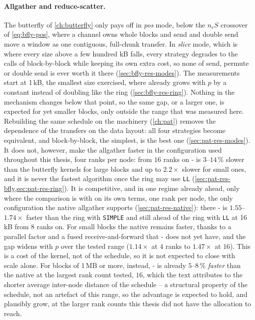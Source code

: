 \paragraph{Allgather and reduce-scatter.}
The butterfly of \cref{ch:butterfly} only pays off in \emph{pos} mode, below the $n_cS$ crossover of \cref{eq:bfly-pos}, where a channel owns whole blocks and send and double send move a window as one contiguous, full-chunk transfer. In \emph{slice} mode, which is where every size above a few hundred kB falls, every strategy degrades to the calls of block-by-block while keeping its own extra cost, so none of send, permute or double send is ever worth it there (\cref{sec:bfly-res-modes}).
The measurements start at 1\,kB, the smallest size exercised, where \bine{} already grows with $p$ by a constant instead of doubling like the ring (\cref{sec:bfly-res-ring}). Nothing in the mechanism changes below that point, so the same gap, or a larger one, is expected for yet smaller blocks, only outside the range that was measured here.
Rebuilding the same schedule on the \pat{} machinery (\cref{ch:pat}) removes the dependence of the transfers on the data layout: all four strategies become equivalent, and block-by-block, the simplest, is the best one (\cref{sec:pat-res-modes}).
It does not, however, make the allgather faster in the configuration used throughout this thesis, four ranks per node: from $16$ ranks on \bine{}-\pat{} is $3$--$14\,\%$ slower than the butterfly kernels for large blocks and up to $2.2\times$ slower for small ones, and it is never the fastest algorithm once the ring may use \texttt{LL} (\cref{sec:pat-res-bfly,sec:pat-res-ring}).
It is competitive, and in one regime already ahead, only where the comparison is with \pat{} on its own terms, one rank per node, the only configuration the native \nccl{} \pat{} allgather supports (\cref{sec:pat-res-native}): there \bine{}-\pat{} is $1.55$--$1.74\times$ faster than the ring with \texttt{SIMPLE} and still ahead of the ring with \texttt{LL} at 16\,kB from $8$ ranks on.
For small blocks the native \pat{} remains faster, thanks to a parallel factor and a fused receive-and-forward that \bine{}-\pat{} does not yet have, and the gap widens with $p$ over the tested range ($1.14\times$ at $4$ ranks to $1.47\times$ at $16$). This is a cost of the kernel, not of the schedule, so it is not expected to close with scale alone.
For blocks of 1\,MB or more, instead, \bine{}-\pat{} is already $5$--$8\,\%$ \emph{faster} than the native \pat{} at the largest rank count tested, $16$, which the text attributes to the shorter average inter-node distance of the \bine{} schedule -- a structural property of the schedule, not an artefact of this range, so the advantage is expected to hold, and plausibly grow, at the larger rank counts this thesis did not have the allocation to reach.

